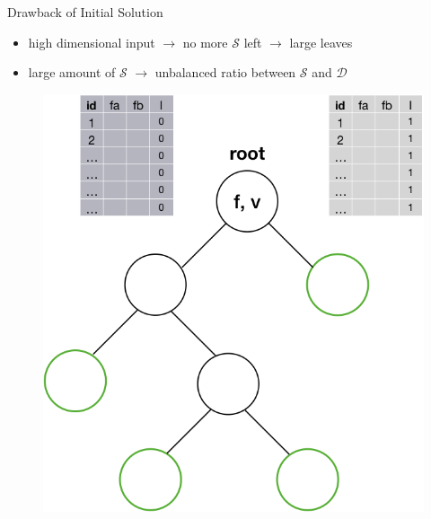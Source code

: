 \documentclass[shortpres]{beamer}
\begin{document}
      \begin{frame}{Drawback of Initial Solution}	
        \begin{itemize} 
          \item high dimensional input $\rightarrow$ no more $\mathcal{S}$ left $\rightarrow$ large leaves
          \item large amount of $\mathcal{S}$ $\rightarrow$ unbalanced ratio between $\mathcal{S}$ and $\mathcal{D}$
        \end{itemize}
          \begin{figure}
            \includegraphics[height=0.5\textheight]{fig/dtwithout3.png} 
          \end{figure}
          \end{frame}
\end{document}
